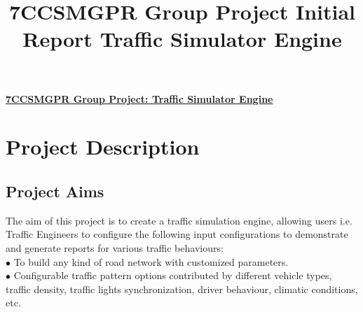 \documentclass[11pt]{article}
\begin{document}



\title{\textbf{7CCSMGPR Group Project}
\textbf{Initial Report} \textbf{Traffic Simulator Engine}}







\begin{center}
\underline{ \textbf{7CCSMGPR Group Project: Traffic Simulator Engine} }
\end{center}

\section{Project Description}\label{PD}
	
	\subsection{Project Aims}\label{Aims}
	The aim of this project is to create a traffic simulation engine, allowing users i.e. Traffic Engineers to configure the following input configurations to demonstrate and generate reports for various traffic behaviours:\\
		$\bullet$ To build any kind of road network with customized parameters.\\
		$\bullet$ Configurable traffic pattern options contributed by different vehicle types, traffic density, traffic lights synchronization, driver behaviour, climatic conditions, etc.
		
\end{document}
